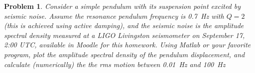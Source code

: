 \documentclass{article}
\newtheorem{plm}{Problem}
\begin{document}
\begin{plm}
  Consider a simple pendulum with its suspension point excited by seismic noise.
  Assume the resonance pendulum frequency is \SI{0.7}{Hz} with $Q=2$ (this is achieved using active damping),
  and the seismic noise is the amplitude spectral density measured at a LIGO Livingston seismometer on September 17, 2:00 UTC,
  available in Moodle for this homework.
  Using Matlab or your favorite program, plot the amplitude spectral density of the pendulum displacement,
  and calculate (numerically) the the rms motion between \SI{0.01}{Hz} and \SI{100}{Hz}
\end{plm}
\end{document}
